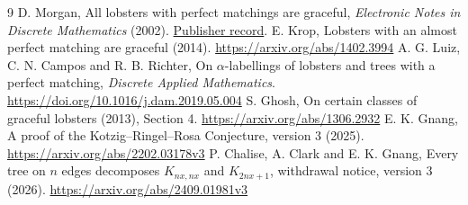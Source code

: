 \documentclass[11pt,a4paper]{article}
\begin{document}
\begin{thebibliography}{9}
 D. Morgan, All lobsters with perfect matchings are graceful, \emph{Electronic Notes in Discrete Mathematics} (2002). \href{https://www.sciencedirect.com/science/article/abs/pii/S1571065304000952}{Publisher record}.
 E. Krop, Lobsters with an almost perfect matching are graceful (2014). \url{https://arxiv.org/abs/1402.3994}
 A. G. Luiz, C. N. Campos and R. B. Richter, On $\alpha$-labellings of lobsters and trees with a perfect matching, \emph{Discrete Applied Mathematics}. \url{https://doi.org/10.1016/j.dam.2019.05.004}
 S. Ghosh, On certain classes of graceful lobsters (2013), Section 4. \url{https://arxiv.org/abs/1306.2932}
 E. K. Gnang, A proof of the Kotzig--Ringel--Rosa Conjecture, version 3 (2025). \url{https://arxiv.org/abs/2202.03178v3}
 P. Chalise, A. Clark and E. K. Gnang, Every tree on $n$ edges decomposes $K_{nx,nx}$ and $K_{2nx+1}$, withdrawal notice, version 3 (2026). \url{https://arxiv.org/abs/2409.01981v3}
\end{thebibliography}
\end{document}
